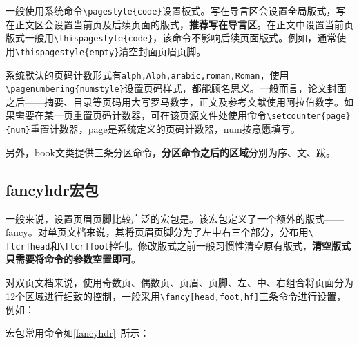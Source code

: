 一般使用系统命令\lstinline|\pagestyle{code}|设置板式。写在导言区会设置全局版式，写在正文区会设置当前页及后续页面的版式，\textbf{推荐写在导言区}。在正文中设置当前页版式一般用\lstinline|\thispagestyle{code}|，该命令不影响后续页面版式。例如，通常使用\lstinline|\thispagestyle{empty}|清空封面页眉页脚。

系统默认的页码计数形式有\lstinline|alph,Alph,arabic,roman,Roman|，使用\lstinline|\pagenumbering{numstyle}|设置页码样式，都能顾名思义。一般而言，论文封面之后——摘要、目录等页码用大写罗马数字，正文及参考文献使用阿拉伯数字。如果需要在某一页重置页码计数器，可在该页源文件处使用命令\lstinline|\setcounter{page}{num}|重置计数器，page是系统定义的页码计数器，num按意愿填写。

另外，book文类提供三条分区命令，\textbf{分区命令之后的区域}分别为序、文、跋。

\begin{latex}
\frontmatter
\mainmatter
\backmatter
\end{latex}

\subsection{fancyhdr宏包}
一般来说，设置页眉页脚比较广泛的宏包是。该宏包定义了一个额外的版式——fancy。对单页文档来说，其将页眉页脚分为了左中右三个部分，分布用\lstinline|\[lcr]head|和\lstinline|\[lcr]foot|控制。修改版式之前一般习惯性清空原有版式，\textbf{清空版式只需要将命令的参数空置即可}。

\begin{latex}
\usepackage{fancyhdr}
\pagestyle{fancy}
\fancyhf{}%
    \lhead{}
    \chead{}
    \cfoot{\thepage}
\end{latex}

对双页文档来说，使用奇数页、偶数页、页眉、页脚、左、中、右组合将页面分为12个区域进行细致的控制，一般采用\lstinline|\fancy[head,foot,hf]|三条命令进行设置，例如：

\begin{latex}
\fancyhead[LE,RO]{\slshape\rightmark}
\fancyhead[LO,RE]{\slshape\leftmark}
\fancyfoot[C]{\thepage}
\end{latex}

宏包常用命令如\autoref{fancyhdr}~所示：

